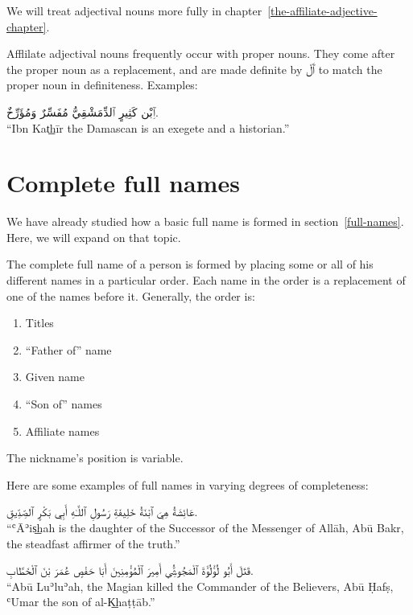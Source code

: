 \documentclass[
  10pt,
]{book}
\providecommand{\tightlist}{%
  \setlength{\itemsep}{0pt}\setlength{\parskip}{0pt}}
\begin{document}
We will treat adjectival nouns more fully in chapter~\ref{the-affiliate-adjective-chapter}.

Afflilate adjectival nouns frequently occur with proper nouns. They come after the proper noun as a replacement, and are made definite by \foreignlanguage{arabic}{ٱَلْ} to match the proper noun in definiteness. Examples:

\foreignlanguage{arabic}{ٱِبْن کَثِيرٍ ٱلدِّمَشْقِيُّ مُفَسِّرٌ وَمُؤَرِّخٌ.}\\
\enquote{Ibn Kat͟hīr the Damascan is an exegete and a historian.}

\section{Complete full names}\label{complete-full-names}

We have already studied how a basic full name is formed in section~\ref{full-names}. Here, we will expand on that topic.

The complete full name of a person is formed by placing some or all of his different names in a particular order. Each name in the order is a replacement of one of the names before it. Generally, the order is:

\begin{enumerate}
\def\labelenumi{\roman{enumi}.}
\tightlist
\item
  Titles
\item
  \enquote{Father of} name
\item
  Given name
\item
  \enquote{Son of} names
\item
  Affiliate names
\end{enumerate}

The nickname's position is variable.

Here are some examples of full names in varying degrees of completeness:

\foreignlanguage{arabic}{عَائِشَةُ هِيَ ٱبْنَةُ خَلِيفَةِ رَسُولِ ٱللَّـٰهِ أَبِي بَکْرٍ ٱلصِّدِّيقِ.}\\
\enquote{ʿĀʾis͟hah is the daughter of the Successor of the Messenger of Allāh, Abū Bakr, the steadfast affirmer of the truth.}

\foreignlanguage{arabic}{قَتَلَ أَبُو لُؤْلُؤَةَ ٱلْمَجُوسِيُّ أَمِيرَ ٱلْمُؤْمِنِينَ أَبَا حَفْصٍ عُمَرَ بْنَ ٱلْخَطَّابِ.}\\
\enquote{Abū Luʾluʾah, the Magian killed the Commander of the Believers, Abū Ḥafṣ, ʿUmar the son of al-K͟haṭṭāb.}
\end{document}

